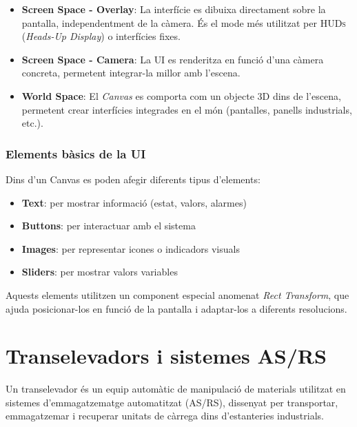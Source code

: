 \documentclass[a4paper,11pt,DIV=13,headings=normal,abstract=true,twoside=semi]{article}
\newcommand{\acro}[1]{\textsc{#1}}
\begin{document}
\begin{itemize}
    \item \textbf{Screen Space - Overlay}: La interfície es dibuixa directament sobre la pantalla, independentment de la càmera. És el mode més utilitzat per \acro{HUDs} (\emph{Heads-Up Display}) o interfícies fixes.
    \item \textbf{Screen Space - Camera}: La \acro{UI} es renderitza en funció d'una càmera concreta, permetent integrar-la millor amb l'escena.
    \item \textbf{World Space}: El \emph{Canvas} es comporta com un objecte 3D dins de l'escena, permetent crear interfícies integrades en el món (pantalles, panells industrials, etc.).
\end{itemize}

\subsubsection{Elements bàsics de la UI}

Dins d'un Canvas es poden afegir diferents tipus d'elements:

\begin{itemize}
\item \textbf{Text}: per mostrar informació (estat, valors, alarmes)
\item \textbf{Buttons}: per interactuar amb el sistema
\item \textbf{Images}: per representar icones o indicadors visuals
\item \textbf{Sliders}: per mostrar valors variables
\end{itemize}

Aquests elements utilitzen un component especial anomenat \emph{Rect Transform}, que ajuda posicionar-los en funció de la pantalla i adaptar-los a diferents resolucions. 

\newpage
\section{Transelevadors i sistemes AS/RS}
\label{sec:asrs}

Un transelevador \cite{transelevador_info} és un equip automàtic de manipulació de materials utilitzat en sistemes d'emmagatzematge automatitzat (\acro{AS/RS}), dissenyat per transportar, emmagatzemar i recuperar unitats de càrrega dins d'estanteries industrials.
\end{document}
